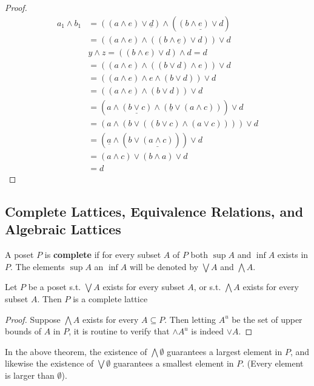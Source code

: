 \documentclass[11pt]{article}
\begin{document}
\begin{proof}
\begin{align*}
a_1\wedge b_1&=((a\wedge e)\vee\underline{d})\wedge(\underline{(b\wedge e)\vee d})\\
&=((a\wedge e)\wedge((b\wedge\underline{e})\vee d))\vee d\tag*{(by M)}\\
&y\wedge z=((b\wedge e)\vee d)\wedge d=d\\
&=((a\wedge e)\wedge((b\vee d)\wedge e))\vee d\tag*{(by M)}\\
&=((a\wedge e)\wedge e\wedge(b\vee d))\vee d\\
&=((a\wedge e)\wedge(b\vee d))\vee d\\
&=(a\wedge\underline{(b\vee c)}\wedge(\underline{b}\vee(a\wedge c)))\vee d\\
&=(a\wedge(b\vee((b\vee c)\wedge(a\vee c))))\vee d\tag*{(by M)}\\
&=(\underline{a}\wedge(b\vee\underline{(a\wedge c)}))\vee d
\tag*{$a\wedge c\le b\vee c$}\\
&=(a\wedge c)\vee(b\wedge a)\vee d\tag*{(by M)}\\
&=d
\end{align*}
\end{proof}


\subsection{Complete Lattices, Equivalence Relations, and Algebraic Lattices}
\label{sec:org862677c}
\begin{definition}[]
A poset \(P\) is \textbf{complete} if for every subset \(A\) of \(P\) both \(\sup A\) and
\(\inf A\) exists in \(P\). The elements \(\sup A\) an \(\inf A\) will be
denoted by \(\bigvee A\) and \(\bigwedge A\).
\end{definition}

\begin{theorem}[]
Let \(P\) be a poset s.t. \(\bigvee A\) exists for every subset \(A\), or s.t. 
\(\bigwedge A\) exists for every subset \(A\). Then \(P\) is a complete lattice
\end{theorem}

\begin{proof}
Suppose \(\bigwedge A\) exists for every \(A\subseteq P\). Then letting \(A^u\)
be the set of upper bounds of \(A\) in \(P\), it is routine to verify that
\(\wedge A^u\) is indeed \(\vee A\).
\end{proof}

In the above theorem, the existence of \(\bigwedge\emptyset\) guarantees a
largest element in \(P\), and likewise the existence of \(\bigvee\emptyset\)
guarantees a smallest element in \(P\). (Every element is larger than
\(\emptyset\)).
\end{document}
